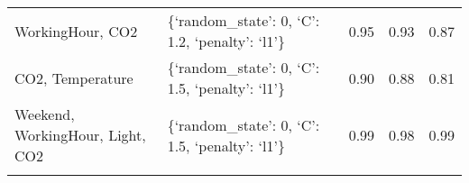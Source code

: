 \documentclass[11pt]{article}
\begin{document}
\begin{longtable}[]{@{}lllll@{}}
\begin{minipage}[t]{0.28\columnwidth}\raggedright
WorkingHour, CO2\strut
\end{minipage} & \begin{minipage}[t]{0.39\columnwidth}\raggedright
\{`random\_state': 0, `C': 1.2, `penalty': `l1'\}\strut
\end{minipage} & \begin{minipage}[t]{0.06\columnwidth}\raggedright
0.95\strut
\end{minipage} & \begin{minipage}[t]{0.06\columnwidth}\raggedright
0.93\strut
\end{minipage} & \begin{minipage}[t]{0.06\columnwidth}\raggedright
0.87\strut
\end{minipage}\tabularnewline
\begin{minipage}[t]{0.28\columnwidth}\raggedright
CO2, Temperature\strut
\end{minipage} & \begin{minipage}[t]{0.39\columnwidth}\raggedright
\{`random\_state': 0, `C': 1.5, `penalty': `l1'\}\strut
\end{minipage} & \begin{minipage}[t]{0.06\columnwidth}\raggedright
0.90\strut
\end{minipage} & \begin{minipage}[t]{0.06\columnwidth}\raggedright
0.88\strut
\end{minipage} & \begin{minipage}[t]{0.06\columnwidth}\raggedright
0.81\strut
\end{minipage}\tabularnewline
\begin{minipage}[t]{0.28\columnwidth}\raggedright
Weekend, WorkingHour, Light, CO2\strut
\end{minipage} & \begin{minipage}[t]{0.39\columnwidth}\raggedright
\{`random\_state': 0, `C': 1.5, `penalty': `l1'\}\strut
\end{minipage} & \begin{minipage}[t]{0.06\columnwidth}\raggedright
0.99\strut
\end{minipage} & \begin{minipage}[t]{0.06\columnwidth}\raggedright
0.98\strut
\end{minipage} & \begin{minipage}[t]{0.06\columnwidth}\raggedright
0.99\strut
\end{minipage}\tabularnewline
\begin{minipage}[t]{0.28\columnwidth}\raggedright

\end{minipage}
\end{longtable}
\end{document}
